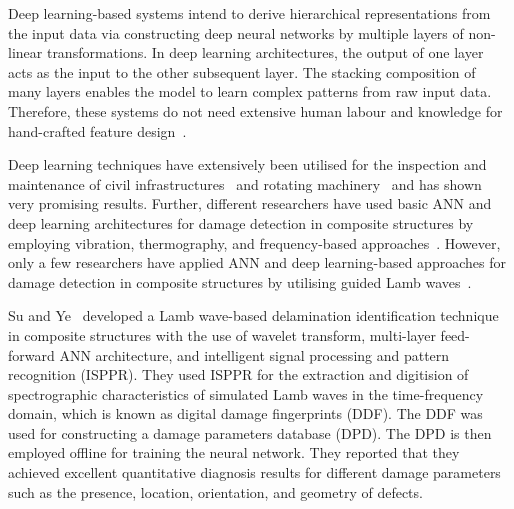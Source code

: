 Deep learning-based systems intend to derive hierarchical representations
from the input data via constructing deep neural networks by multiple layers
of non-linear transformations.
In deep learning architectures, the output of one layer acts as the input to the other subsequent layer.
The stacking composition of many layers enables the model to learn complex patterns from raw input data.
Therefore, these systems do not need extensive human labour and knowledge for 
hand-crafted feature design~\cite{Zhao2019b}. %

Deep learning techniques have extensively been utilised for the inspection and
maintenance of civil infrastructures~\cite{cha2017deep, Lin2017a, Liu2019} and 
rotating machinery~\cite{janssens2016convolutional, Jia2016a} and has shown 
very promising results.
Further, different researchers have used basic ANN and deep learning 
architectures for damage detection in composite structures by employing 
vibration, thermography, and frequency-based approaches~\cite{chakraborty2005artificial, Khan2019a, luo2019temporal, 
bang2020defect}. 
However, only a few researchers have applied ANN and deep learning-based 
approaches for damage detection in composite structures by utilising guided 
Lamb waves~\cite{Su2004a, chetwynd2008damage, de2015application, feng2019locating, 
mardanshahi2020detection, qian2020application, Tabian2019, 
rautela2021ultrasonic}.

Su and Ye~\cite{Su2004a} developed a Lamb wave-based delamination identification 
technique in composite structures with the use of wavelet transform, 
multi-layer feed-forward ANN architecture, and intelligent signal processing and 
pattern recognition (ISPPR).
They used ISPPR for the extraction and digitision of spectrographic characteristics of simulated Lamb waves in the time-frequency domain, which is known as digital damage fingerprints (DDF).
The DDF was used for constructing a damage parameters database (DPD). 
The DPD is then employed offline for training the neural network.  
They reported that they achieved excellent quantitative diagnosis results for different damage parameters such as the presence, location, orientation, and geometry of defects.


